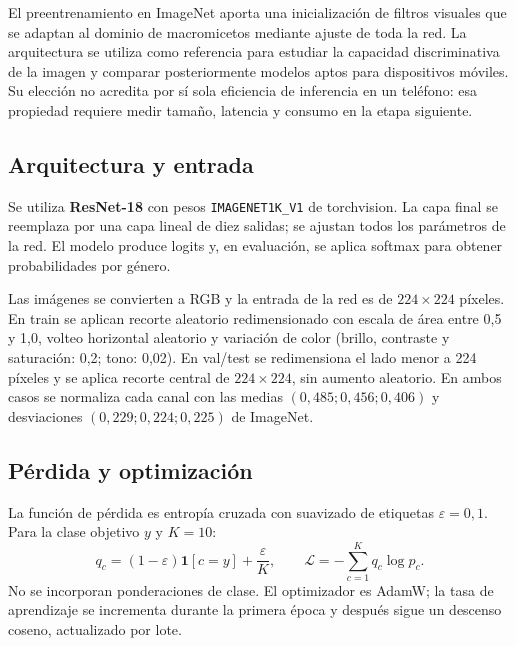\documentclass[11pt,a4paper]{article}
\newcommand{\archivo}[1]{\nolinkurl{#1}}
\begin{document}
El preentrenamiento en ImageNet aporta una inicialización de filtros visuales
que se adaptan al dominio de macromicetos mediante ajuste de toda la red. La
arquitectura se utiliza como referencia para estudiar la capacidad discriminativa
de la imagen y comparar posteriormente modelos aptos para dispositivos móviles.
Su elección no acredita por sí sola eficiencia de inferencia en un teléfono:
esa propiedad requiere medir tamaño, latencia y consumo en la etapa siguiente.

\subsection{Arquitectura y entrada}

Se utiliza \textbf{ResNet-18} con pesos \archivo{IMAGENET1K_V1} de torchvision.
La capa final se reemplaza por una capa lineal de diez salidas; se ajustan todos
los parámetros de la red. El modelo produce logits y, en evaluación, se aplica
softmax para obtener probabilidades por género.

Las imágenes se convierten a RGB y la entrada de la red es de
\(224\times224\) píxeles. En train se aplican recorte aleatorio redimensionado
con escala de área entre 0,5 y 1,0, volteo horizontal aleatorio y variación de color
(brillo, contraste y saturación: 0,2; tono: 0,02).
En val/test se redimensiona el lado menor a 224 píxeles y se aplica recorte central
de \(224\times224\), sin aumento aleatorio. En ambos casos se normaliza cada
canal con las medias \((0,485;0,456;0,406)\) y desviaciones
\((0,229;0,224;0,225)\) de ImageNet.

\subsection{Pérdida y optimización}

La función de pérdida es entropía cruzada con suavizado de etiquetas
\(\varepsilon=0,1\). Para la clase objetivo \(y\) y \(K=10\):
\[
q_c=(1-\varepsilon)\mathbf{1}[c=y]+\frac{\varepsilon}{K},
\qquad \mathcal{L}=-\sum_{c=1}^{K}q_c\log p_c.
\]
No se incorporan ponderaciones de clase. El optimizador es AdamW; la tasa de
aprendizaje se incrementa durante la primera época y después sigue un descenso
coseno, actualizado por lote.
\end{document}

